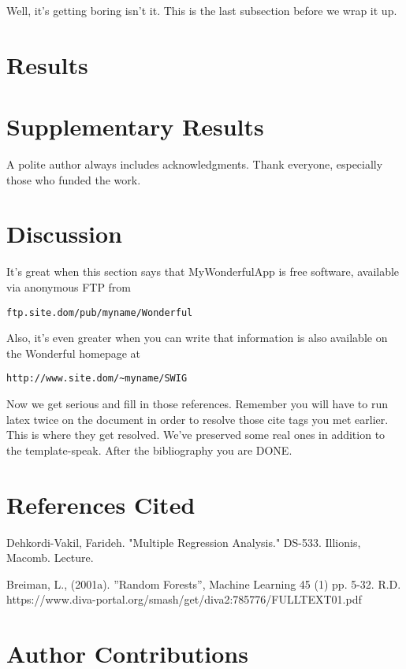 \documentclass[letterpaper,twocolumn,10pt]{article}
\begin{document}
Well, it's getting boring isn't it.  This is the last subsection
before we wrap it up.


\section{Results}

\section{Supplementary Results}

A polite author always includes acknowledgments.  Thank everyone,
especially those who funded the work. 

\section{Discussion}

It's great when this section says that MyWonderfulApp is free software, 
available via anonymous FTP from

\begin{center}
{\tt ftp.site.dom/pub/myname/Wonderful}\\
\end{center}

Also, it's even greater when you can write that information is also 
available on the Wonderful homepage at 

\begin{center}
{\tt http://www.site.dom/\~{}myname/SWIG}
\end{center}

Now we get serious and fill in those references.  Remember you will
have to run latex twice on the document in order to resolve those
cite tags you met earlier.  This is where they get resolved.
We've preserved some real ones in addition to the template-speak.
After the bibliography you are DONE.

\section{References Cited}

Dehkordi-Vakil, Farideh. "Multiple Regression Analysis." DS-533. Illionis, Macomb. Lecture.

Breiman, L., (2001a). ”Random Forests”, Machine Learning 45 (1) pp. 5-32.
R.D. https://www.diva-portal.org/smash/get/diva2:785776/FULLTEXT01.pdf


\section{Author Contributions}
\end{document}
